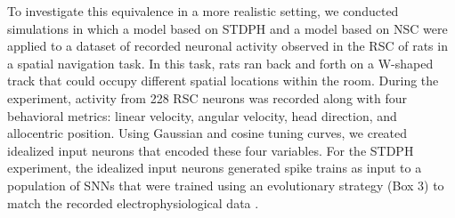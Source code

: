 To investigate this equivalence
in a more realistic setting,
we conducted simulations in which a model based on \ac{STDPH} and a model based on \ac{NSC} were applied to a dataset of recorded neuronal activity observed in the \ac{RSC} of rats in a spatial navigation task. In this task, rats ran back and forth on a W-shaped track that could occupy different spatial locations within the room. During the experiment,
activity from 228 \ac{RSC} neurons 
was recorded along with four behavioral metrics: linear velocity, angular velocity, head direction, and allocentric position. Using Gaussian and cosine tuning curves, we created idealized input neurons that encoded these four variables. For the \ac{STDPH} experiment, the idealized input neurons generated spike trains as input to a population of SNNs that were trained using an evolutionary strategy (Box 3) to match the recorded electrophysiological data \citep{Rounds2016}. 

